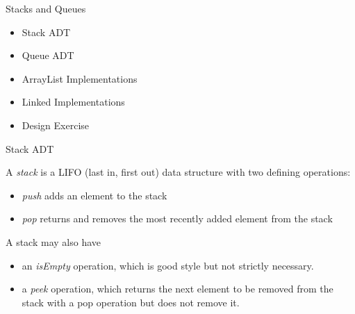 \documentclass{beamer}
\author[Chris Simpkins]
{Christopher Simpkins \\\texttt{chris.simpkins@gatech.edu}}
\institute[Georgia Tech] %
\date[CS 1331]{}
\begin{document}
\begin{frame}
  \titlepage
\end{frame}

\begin{frame}[fragile]{Stacks and Queues}

\begin{itemize}
\item Stack ADT
\item Queue ADT
\item ArrayList Implementations
\item Linked Implementations
\item Design Exercise
\end{itemize}


\end{frame}


\begin{frame}[fragile]{Stack ADT}


A {\it stack} is a LIFO (last in, first out) data structure with two defining operations:
\begin{itemize}
\item {\it push} adds an element to the stack
\item {\it pop} returns and removes the most recently added element from the stack
\end{itemize}

A stack may also have
\begin{itemize}
\item an {\it isEmpty} operation, which is good style but not strictly necessary.
\item a {\it peek} operation, which returns the next element to be removed from the stack with a pop operation but does not remove it.
\end{itemize}



\end{frame}
\end{document}
